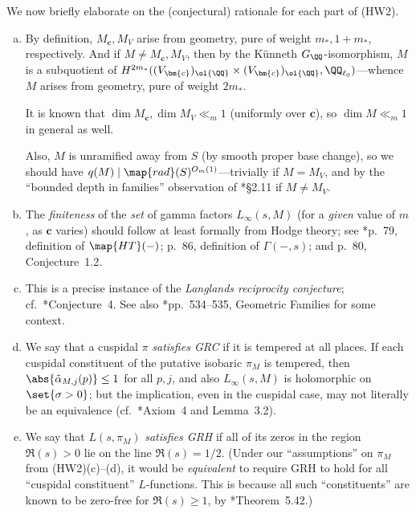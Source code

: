 \documentclass[12pt]{report}
\begin{document}
We now briefly elaborate on the (conjectural) rationale for each part of (HW2).
\begin{enumerate}[(a)]
    \item By definition,
    $M_{\bm{c}},M_V$ arise from geometry,
    pure of weight $m_\ast,1+m_\ast$,
    respectively.
    And if $M\neq M_{\bm{c}},M_V$,
    then by the K\"{u}nneth $G_\QQ$-isomorphism,
    $M$ is a subquotient of $H^{2m_\ast}((V_{\bm{c}})_{\ol{\QQ}}\times (V_{\bm{c}})_{\ol{\QQ}}, \QQ_{\ell_0})$---whence $M$ arises from geometry,
    pure of weight $2m_\ast$.
    
    It is known that $\dim M_{\bm{c}},\dim M_V\ll_{m}1$
    (uniformly over $\bm{c}$),
    so $\dim M\ll_{m}1$ in general as well.
    
    Also,
    $M$ is unramified away from $S$
    (by smooth proper base change),
    so we should have $q(M)\mid\map{rad}(S)^{O_m(1)}$---trivially if $M=M_V$,
    and by the ``bounded depth in families'' observation of \cite{sarnak2016families}*{\S2.11} if $M\neq M_V$.
    
    \item The \emph{finiteness} of the \emph{set} of gamma factors $L_\infty(s,M)$
    (for a \emph{given} value of $m$,
    as $\bm{c}$ varies)
    should follow at least formally from Hodge theory;
    see \cite{taylor2004galois}*{p.~79, definition of $\map{HT}(-)$;
    p.~86, definition of $\Gamma(-,s)$; and
    p.~80, Conjecture~1.2}.
    
    \item This is a precise instance of the \emph{Langlands reciprocity conjecture};
    cf.~\cite{sarnak2016families}*{Conjecture~4}.
    See also \cite{sarnak2016families}*{pp.~534--535, Geometric Families} for some context.
    
    \item We say that a cuspidal $\pi$ \emph{satisfies GRC} if
    it is tempered at all places.
    If each cuspidal constituent of the putative isobaric $\pi_M$
    is tempered,
    then
    $\abs{\tilde{\alpha}_{M,j}(p)}\leq 1$ for all $p,j$,
    and also $L_\infty(s,M)$ is holomorphic on $\set{\sigma>0}$;
    but the implication,
    even in the cuspidal case,
    may not literally be an equivalence
    (cf.~\cite{farmer2019analytic}*{Axiom~4 and Lemma~3.2}).
    
    \item We say that $L(s,\pi_M)$ \emph{satisfies GRH} if all of its zeros in the region $\Re(s)>0$ lie on the line $\Re(s)=1/2$.
    (Under our ``assumptions'' on $\pi_M$ from (HW2)(c)--(d),
    it would be \emph{equivalent} to require GRH to hold for all ``cuspidal constituent'' $L$-functions.
    This is because all such ``constituents'' are known to be
    zero-free for $\Re(s)\geq 1$,
    by \cite{iwaniec2004analytic}*{Theorem~5.42}.)
\end{enumerate}
\end{document}
